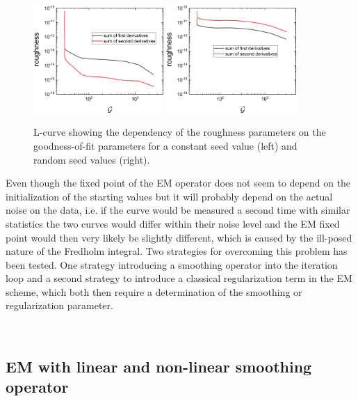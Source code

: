 \begin{figure}[htb]
\centering
\includegraphics[width=0.44\textwidth]{../images/form_factor/EM/EMconstant_seed_smooth_0_0_L_curve.png}
\hspace{0.1\textwidth}
\includegraphics[width=0.44\textwidth]{../images/form_factor/EM/EMrandom_seed_smooth_0_0_L_curve.png}
\caption{L-curve showing the dependency of the roughness parameters on the goodness-of-fit parameters for a constant seed value (left) and random seed values (right).\label{fig:EMLcurves}}
\end{figure}

Even though the fixed point of the EM operator does not seem to depend on the initialization of the starting values but it will probably depend on the actual noise on the data, i.e. if the curve would be measured a second time with similar statistics the two curves would differ within their noise level and the EM fixed point would then very likely be slightly different, which is caused by the ill-posed nature of the Fredholm integral. Two strategies for overcoming this problem has been tested. One strategy introducing a smoothing operator into the iteration loop and a second strategy to introduce a classical regularization term in the EM scheme, which both then require a determination of the smoothing or regularization parameter.

~\\

\subsection{EM with linear and non-linear smoothing operator}~\\

